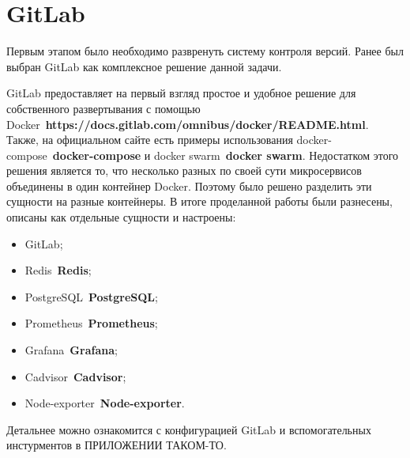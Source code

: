 \section{GitLab}
\label{sec:gitlab}

Первым этапом было необходимо развренуть систему контроля версий. Ранее был выбран GitLab как комплексное решение данной задачи.

GitLab предоставляет на первый взгляд простое и удобное решение для собственного развертывания с помощью Docker~\textbf{https://docs.gitlab.com/omnibus/docker/README.html}. Также, на официальном сайте есть примеры использования docker-compose~\textbf{docker-compose} и docker swarm~\textbf{docker swarm}. Недостатком этого решения является то, что несколько разных по своей сути микросервисов объединены в один контейнер Docker. Поэтому было решено разделить эти сущности на разные контейнеры. В итоге проделанной работы были разнесены, описаны как отдельные сущности и настроены:
\begin{itemize}
    \item GitLab;
    \item Redis~\textbf{Redis};
    \item PostgreSQL~\textbf{PostgreSQL};
    \item Prometheus~\textbf{Prometheus};
    \item Grafana~\textbf{Grafana};
    \item Cadvisor~\textbf{Cadvisor};
    \item Node-exporter~\textbf{Node-exporter}.
\end{itemize}

Детальнее можно ознакомится с конфигурацией GitLab и вспомогательных инстурментов в ПРИЛОЖЕНИИ ТАКОМ-ТО.
